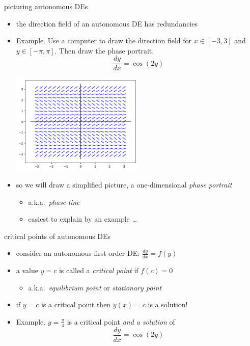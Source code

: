 \documentclass[colorlinks]{beamer}
\begin{document}
\begin{frame}{picturing autonomous DEs}

\begin{itemize}
\item the direction field of an autonomous DE has redundancies

\medskip
\item \begin{minipage}[t]{0.32\textwidth} \small
Example.  Use a computer to draw the direction field for $x \in [-3,3]$ and $y\in [-\pi,\pi]$.  Then draw the phase portrait. 
    $$\frac{dy}{dx} = \cos(2y)$$
\end{minipage}

\vspace{-30mm}
\hfill \includegraphics[width=0.5\textwidth]{figs/autonomous-cos} \phantom{dfjsdf}

\bigskip
\item so we will draw a simplified picture, a one-dimensional \emph{phase portrait}
    \begin{itemize}
    \item a.k.a.~\emph{phase line}
    \item easiest to explain by an example \dots
    \end{itemize}

\end{itemize}
\end{frame}


\begin{frame}{critical points of autonomous DEs}

\begin{itemize}
\item consider an autonomous first-order DE: \quad $\frac{dy}{dx} = f(y)$
\item a value $y=c$ is called a \emph{critical point} if $f(c)=0$
    \begin{itemize}
    \item a.k.a.~\emph{equilibrium point} or \emph{stationary point}
    \end{itemize}

\medskip
\item if $y=c$ is a critical point then $y(x)=c$ is a solution!

\medskip
\item Example.  $y=\frac{\pi}{4}$ is a critical point \emph{and a solution} of
    $$\frac{dy}{dx} = \cos(2y)$$

\vspace{5mm}
\end{itemize}
\end{frame}
\end{document}
